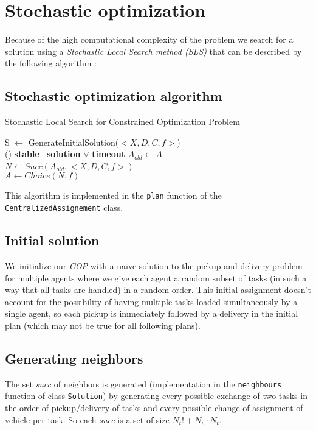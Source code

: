 \documentclass[11pt]{article}
\begin{document}
\section{Stochastic optimization}

Because of the high computational complexity of the problem we search for a solution using a \textit{Stochastic Local Search method (SLS)} that can be described by the following algorithm :


\subsection{Stochastic optimization algorithm}
\begin{algorithm}[H]
    \SetAlgoLined
    \caption{Stochastic Local Search for Constrained Optimization Problem}
    S $\leftarrow$ GenerateInitialSolution($<X,D,C,f>$) \\
    \Repeat(){  \textbf{stable\_solution} $\lor$ \textbf{timeout} }{
        $A_{old} \leftarrow A$ \\
        $N \leftarrow Succ(A_{old},<X,D,C,f>)$ \\
        $A \leftarrow Choice(N,f)$
    }
\end{algorithm}
This algorithm is implemented in the \texttt{plan} function of the \texttt{CentralizedAssignement} class.
\subsection{Initial solution}
We initialize our \textit{COP} with a naïve solution to the pickup and delivery problem for multiple agents where we give each agent a random subset of tasks (in such a way that all tasks are handled) in a random order. This initial assignment doesn't account for the possibility of having multiple tasks loaded simultaneously by a single agent, so each pickup is immediately followed by a delivery in the initial plan (which may not be true for all following plans).

\subsection{Generating neighbors}
The set \textit{succ} of neighbors is generated (implementation in the \texttt{neighbours} function of class \texttt{Solution}) by generating  every possible exchange of two tasks in the order of pickup/delivery of tasks and every possible change of assignment of vehicle per task. So each \textit{succ} is a set of size $N_t!+N_v\cdot N_t$.
\end{document}
